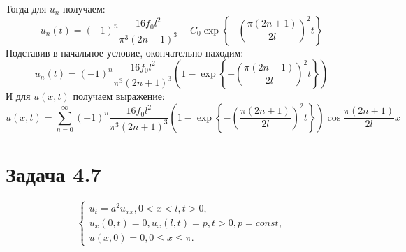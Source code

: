 \documentclass[11pt]{article}
\begin{document}
Тогда для $u_n$ получаем:
\begin{equation*}
u_n(t) = (-1)^n\frac{16f_0l^2}{\pi^3(2n + 1)^3} + C_0\exp\left\{-\left(\frac{\pi(2n + 1)}{2l}\right)^2t\right\}
\end{equation*}
Подставив в начальное условие, окончательно находим:
\begin{equation*}
u_n(t) = (-1)^n\frac{16f_0l^2}{\pi^3(2n + 1)^3}\left(1 - \exp\left\{-\left(\frac{\pi(2n + 1)}{2l}\right)^2t\right\}\right)
\end{equation*}
И для $u(x, t)$ получаем выражение:
\begin{equation}
u(x, t) = \sum_{n = 0}^{\infty}(-1)^n\frac{16f_0l^2}{\pi^3(2n + 1)^3}\left(1 - \exp\left\{-\left(\frac{\pi(2n + 1)}{2l}\right)^2t\right\}\right)\cos\frac{\pi(2n + 1)}{2l}x
\end{equation}
\section{Задача 4.7}
\label{sec:orgebccd38}
\begin{equation}
\begin{cases}
u_t = a^2u_{xx}, 0 < x < l, t > 0, \\
u_x(0, t) = 0, u_x(l, t) = p, t > 0, p = const, \\
u(x, 0) = 0, 0 \leq x \leq \pi.
\end{cases}
\end{equation}
\end{document}

